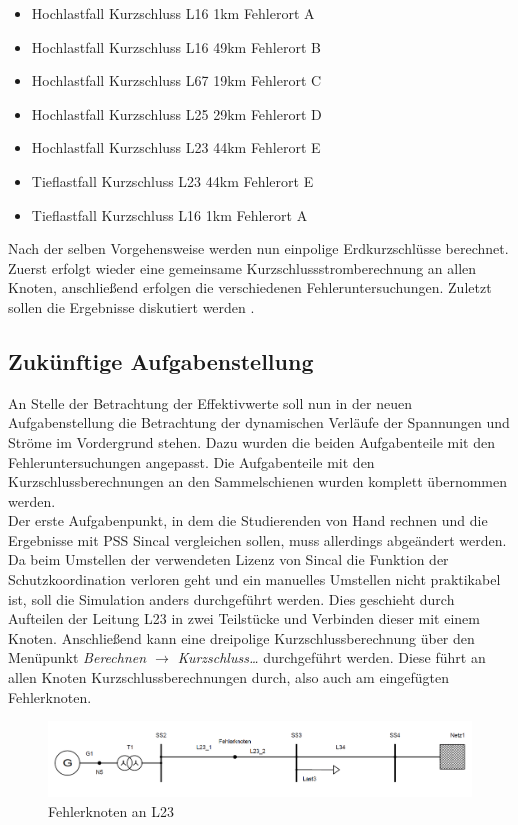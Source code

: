 \documentclass{scrartcl}
\begin{document}
\begin{onehalfspace}
\begin{itemize}
\item Hochlastfall Kurzschluss L16 1km Fehlerort A
\item Hochlastfall Kurzschluss L16 49km Fehlerort B
\item Hochlastfall Kurzschluss L67 19km Fehlerort C
\item Hochlastfall Kurzschluss L25 29km Fehlerort D
\item Hochlastfall Kurzschluss L23 44km Fehlerort E
\item Tieflastfall Kurzschluss L23 44km Fehlerort E
\item Tieflastfall Kurzschluss L16 1km Fehlerort A
\end{itemize}

Nach der selben Vorgehensweise werden nun einpolige Erdkurzschlüsse berechnet. Zuerst erfolgt wieder eine gemeinsame Kurzschlussstromberechnung an allen Knoten, anschließend erfolgen die verschiedenen Fehleruntersuchungen. Zuletzt sollen die Ergebnisse diskutiert werden \cite{praktikum-anleitung}.


\subsection{Zukünftige Aufgabenstellung}
An Stelle der Betrachtung der Effektivwerte soll nun in der neuen Aufgabenstellung die Betrachtung der dynamischen Verläufe der Spannungen und Ströme im Vordergrund stehen. Dazu wurden die beiden Aufgabenteile mit den Fehleruntersuchungen angepasst. Die Aufgabenteile mit den Kurzschlussberechnungen an den Sammelschienen wurden komplett übernommen werden. \\
Der erste Aufgabenpunkt, in dem die Studierenden von Hand rechnen und die Ergebnisse mit PSS Sincal vergleichen sollen, muss allerdings abgeändert werden. Da beim Umstellen der verwendeten Lizenz von Sincal die Funktion der Schutzkoordination verloren geht und ein manuelles Umstellen nicht praktikabel ist, soll die Simulation anders durchgeführt werden. Dies geschieht durch Aufteilen der Leitung L23 in zwei Teilstücke und Verbinden dieser mit einem Knoten. Anschließend kann eine dreipolige Kurzschlussberechnung über den Menüpunkt \textit{Berechnen $\rightarrow$ Kurzschluss…} durchgeführt werden. Diese führt an allen Knoten Kurzschlussberechnungen durch, also auch am eingefügten \glqq Fehlerknoten\grqq.

	\begin{figure}[H]
	\centering
	\includegraphics[scale=0.4]{img/ks-versuch_l23.png}
	\caption{Fehlerknoten an L23}
	\label{fehlerknoten_l23}
	\end{figure}


\end{onehalfspace}
\end{document}
